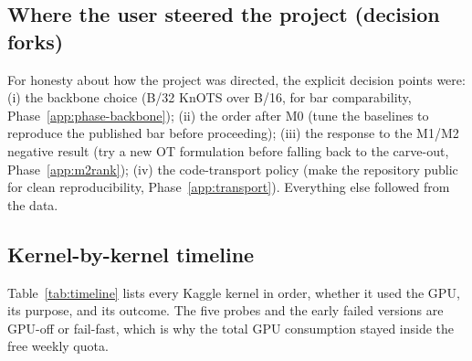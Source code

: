 \subsection{Where the user steered the project (decision forks)}
For honesty about how the project was directed, the explicit decision points were: (i) the backbone
choice (B/32 KnOTS over B/16, for bar comparability, Phase~\ref{app:phase-backbone}); (ii) the order after
M0 (tune the baselines to reproduce the published bar before proceeding); (iii) the response to the M1/M2
negative result (try a new OT formulation before falling back to the carve-out, Phase~\ref{app:m2rank});
(iv) the code-transport policy (make the repository public for clean reproducibility,
Phase~\ref{app:transport}). Everything else followed from the data.

\subsection{Kernel-by-kernel timeline}
Table~\ref{tab:timeline} lists every Kaggle kernel in order, whether it used the GPU, its purpose, and its
outcome. The five probes and the early failed versions are GPU-off or fail-fast, which is why the total
GPU consumption stayed inside the free weekly quota.

